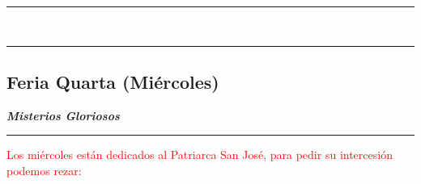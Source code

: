 \documentclass[10pt,twoside]{book}
\begin{document}
\begin{center}
      \begin{spacing}{0.25}
            {\rule{20em}{0.4pt}}\\
            {\rule{20em}{0.4pt}}
      \end{spacing}
\end{center}


\begin{center}
      \section*{Feria Quarta (Miércoles)}

      \textbf{\textsl{\large Misterios Gloriosos}}
\end{center}

\vspace{0.5em}



\vspace{0.5em}



\vspace{0.75em}





\vspace{0.75em}





\vspace{0.75em}





\vspace{0.75em}



{}

\iralfinal

\begin{center}
      {\rule{10em}{0.4pt}}

      \vspace{0.75em}

      \textcolor{red}{Los miércoles están dedicados al Patriarca San José, para pedir su intercesión podemos rezar:}
\end{center}
\vspace{-1em}
\begin{multicols}{2}
      
\end{multicols}
\end{document}
